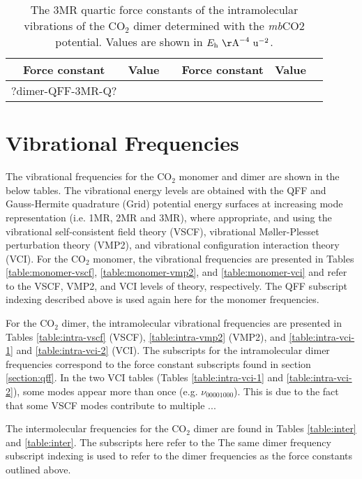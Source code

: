 \documentclass[aip,jcp,showpacs,superscriptaddress,groupedaddress]{revtex4-1}  %
\begin{document}
\begin{table}[H]
\centering
\caption{The 3MR quartic force constants of the intramolecular vibrations of the CO$_2$ dimer determined with the \emph{mb}CO2 potential. Values are shown in $E_{\rm h}\ {\rm \AA}^{-4}\ {\rm u}^{-2}$.}
\label{table:qff_dimer-3mr-q}
\begin{ruledtabular}
\begin{tabular}{cccccc}
Force constant & Value      &  & Force constant & Value      &    \\
\hline \Tstrut
?dimer-QFF-3MR-Q?
\end{tabular}
\end{ruledtabular}
\end{table}

\section[S2]{\label{sec:vibrations}Vibrational Frequencies}
The vibrational frequencies for the CO$_2$ monomer and dimer are shown in the below tables. The vibrational energy levels are obtained with the QFF and Gauss-Hermite quadrature (Grid) potential energy surfaces at increasing mode representation (i.e. 1MR, 2MR and 3MR), where appropriate, and using the vibrational self-consistent field theory (VSCF), vibrational M{\o}ller-Plesset perturbation theory (VMP2), and vibrational configuration interaction theory (VCI). For the CO$_2$ monomer, the vibrational frequencies are presented in Tables \ref{table:monomer-vscf}, \ref{table:monomer-vmp2}, and \ref{table:monomer-vci} and refer to the VSCF, VMP2, and VCI levels of theory, respectively. The QFF subscript indexing described above is used again here for the monomer frequencies. 

For the CO$_2$ dimer, the intramolecular vibrational frequencies are presented in Tables \ref{table:intra-vscf} (VSCF), \ref{table:intra-vmp2} (VMP2),  and \ref{table:intra-vci-1} and \ref{table:intra-vci-2} (VCI). The subscripts for the intramolecular dimer frequencies correspond to the force constant subscripts found in section \ref{section:qff}. In the two VCI tables (Tables \ref{table:intra-vci-1} and \ref{table:intra-vci-2}), some modes appear more than once (e.g. $\nu_{00001000}$). This is due to the fact that some VSCF modes contribute to multiple ...

The intermolecular frequencies for the CO$_2$ dimer are found in Tables \ref{table:inter} and \ref{table:inter}. The subscripts here refer to the The same dimer frequency subscript indexing is used to refer to the dimer frequencies as the force constants outlined above.
\end{document}
